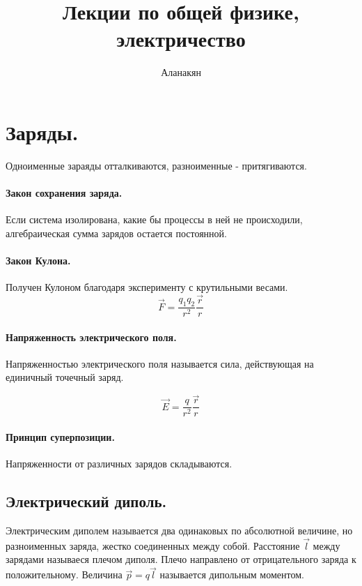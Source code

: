 \documentclass{article}
\author{Аланакян}
\title{Лекции по общей физике, электричество}
\begin{document}
    \maketitle
    \pagebreak
    
    \section*{Заряды.}
    
	Одноименные зараяды отталкиваются, разноименные - притягиваются.
	    
    \paragraph{Закон сохранения заряда.} Если система изолирована, какие бы процессы в ней не происходили, алгебраическая сумма зарядов остается постоянной.
    
    \paragraph{Закон Кулона.} Получен Кулоном благодаря эксперименту с крутильными весами.
    $$ \overrightarrow{F} = \frac{q_1q_2}{r^2} \frac{\overrightarrow{r}}{r} $$
    
    \paragraph{Напряженность электрического поля.} Напряженностью электрического поля называется сила, действующая на единичный точечный заряд.
   
    $$ \overrightarrow{E} = \frac{q}{r^2} \frac{\overrightarrow{r}}{r} $$
   
    \paragraph{Принцип суперпозиции.} Напряженности от различных зарядов складываются.
   
    \subsection*{Электрический диполь.} Электрическим диполем называется два одинаковых по абсолютной величине, но разноименных заряда, жестко соединенных между собой. Расстояние $\overrightarrow{l}$ между зарядами называеся плечом диполя. Плечо направлено от отрицательного заряда к положительному. Величина $\overrightarrow{p} = q\overrightarrow{l}$ называется дипольным моментом.
    
\end{document}
